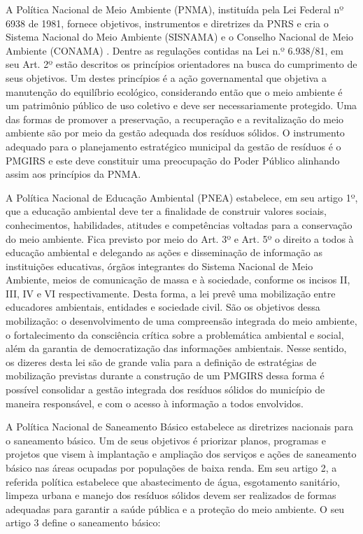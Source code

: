 	A Política Nacional de Meio Ambiente (PNMA), instituída pela Lei Federal nº 6938 de 1981, fornece objetivos, instrumentos e diretrizes da PNRS e cria o Sistema Nacional do Meio Ambiente (SISNAMA) e o Conselho Nacional de Meio Ambiente (CONAMA) \cite{machado2012principios}. Dentre as regulações contidas na Lei n.º 6.938/81, em seu Art. 2º estão descritos os princípios orientadores na busca do cumprimento de seus objetivos. Um destes princípios é a ação governamental que objetiva a manutenção do equilíbrio ecológico, considerando então que o meio ambiente é um patrimônio público de uso coletivo e deve ser necessariamente protegido. Uma das formas de promover a preservação, a recuperação e a revitalização do meio ambiente são por meio da gestão adequada dos resíduos sólidos. O instrumento adequado para o planejamento estratégico municipal da gestão de resíduos é o PMGIRS e este deve constituir uma preocupação do Poder Público alinhando assim aos princípios da PNMA.
	
	A Política Nacional de Educação Ambiental (PNEA) estabelece, em seu artigo 1º, que a educação ambiental deve ter a finalidade de construir valores sociais, conhecimentos, habilidades, atitudes e competências voltadas para a conservação do meio ambiente. Fica previsto por meio do Art. 3º e Art. 5º o direito a todos à educação ambiental e delegando as ações e disseminação de informação as instituições educativas, órgãos integrantes do Sistema Nacional de Meio Ambiente, meios de comunicação de massa e à sociedade, conforme os incisos II, III, IV e VI respectivamente. Desta forma, a lei \cite{L979597:online} prevê uma mobilização entre educadores ambientais, entidades e sociedade civil. São os objetivos dessa mobilização: o desenvolvimento de uma compreensão integrada do meio ambiente, o fortalecimento da consciência crítica sobre a problemática ambiental e social, além da garantia de democratização das informações ambientais.  Nesse sentido, os dizeres desta lei são de grande valia para a definição de estratégias de mobilização previstas durante a construção de um PMGIRS dessa forma é possível consolidar a gestão integrada dos resíduos sólidos do município de maneira responsável, e com o acesso à informação a todos envolvidos.
	
	A Política Nacional de Saneamento Básico estabelece as diretrizes nacionais para o saneamento básico. Um de seus objetivos é priorizar planos, programas e projetos que visem à implantação e ampliação dos serviços e ações de saneamento básico nas áreas ocupadas por populações de baixa renda. Em seu artigo 2, a referida política estabelece que abastecimento de água, esgotamento sanitário, limpeza urbana e manejo dos resíduos sólidos devem ser realizados de formas adequadas para garantir a saúde pública e a proteção do meio ambiente. O seu artigo 3 define o saneamento básico:
	
